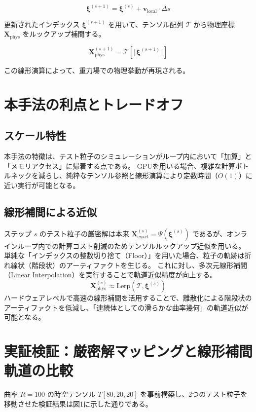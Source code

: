 \documentclass[11pt]{ltjsarticle}
\begin{document}
\[
\boldsymbol{\xi}^{(s+1)} = \boldsymbol{\xi}^{(s)} + \mathbf{v}_{\text{local}} \cdot \Delta s
\]

更新されたインデックス $\boldsymbol{\xi}^{(s+1)}$ を用いて、テンソル配列 $\mathcal{T}$ から物理座標 $\mathbf{X}_{\text{phys}}$ をルックアップ補間する。

\[
\mathbf{X}_{\text{phys}}^{(s+1)} = \mathcal{T} [\lfloor \boldsymbol{\xi}^{(s+1)} \rfloor ]
\]

この線形演算によって、重力場での物理挙動が再現される。

\section{本手法の利点とトレードオフ}

\subsection{スケール特性}
本手法の特徴は、テスト粒子のシミュレーションがループ内において「加算」と「メモリアクセス」に帰着する点である。
GPUを用いる場合、複雑な計算ボトルネックを減らし、純粋なテンソル参照と線形演算により定数時間（$O(1)$）に近い実行が可能となる。

\subsection{線形補間による近似}
ステップ $s$ のテスト粒子の厳密解は本来 $\mathbf{X}_{\text{exact}}^{(s)} = \Psi(\boldsymbol{\xi}^{(s)})$ であるが、オンラインループ内での計算コスト削減のためテンソルルックアップ近似を用いる。
単純な「インデックスの整数切り捨て（Floor）」を用いた場合、粒子の軌跡は折れ線状（階段状）のアーティファクトを生じる。
これに対し、多次元線形補間（Linear Interpolation）を実行することで軌道近似精度が向上する。
\[
\mathbf{X}_{\text{phys}}^{(s)} \approx \mathrm{Lerp}(\mathcal{T}, \boldsymbol{\xi}^{(s)})
\]
ハードウェアレベルで高速の線形補間を活用することで、離散化による階段状のアーティファクトを低減し、「連続体としての滑らかな曲率幾何」の軌道近似が可能となる。

\section{実証検証：厳密解マッピングと線形補間軌道の比較}

曲率 $R=100$ の時空テンソル $T[80, 20, 20]$ を事前構築し、2つのテスト粒子を移動させた検証結果は図1に示した通りである。
\end{document}
